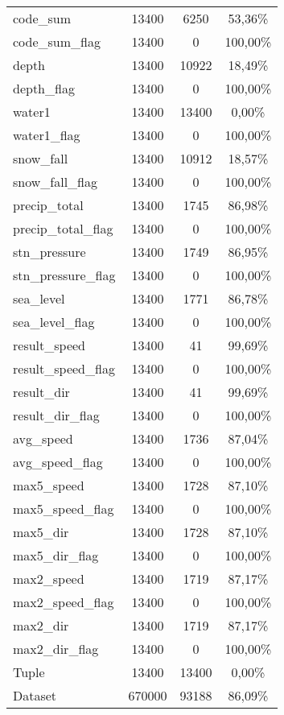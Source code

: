 \begin{longtable}{lccc}
		code\_sum			& 13400 & 6250	     & 53,36\%  	\\
		code\_sum\_flag		& 13400 & 0		     & 100,00\% 	\\	
		depth				& 13400 & 10922		 & 18,49\%  	\\
		depth\_flag			& 13400 & 0		   	 & 100,00\%		\\	
		water1				& 13400 & 13400		 & 0,00\%		\\
		water1\_flag		& 13400 & 0		   	 & 100,00\%		\\	
		snow\_fall			& 13400 & 10912		 & 18,57\%		\\	
		snow\_fall\_flag	& 13400 & 0		   	 & 100,00\%		\\		
		precip\_total		& 13400 & 1745		 & 86,98\%		\\	
		precip\_total\_flag	& 13400 & 0		   	 & 100,00\%		\\		
		stn\_pressure		& 13400 & 1749		 & 86,95\%		\\	
		stn\_pressure\_flag	& 13400 & 0		   	 & 100,00\%		\\		
		sea\_level			& 13400 & 1771		 & 86,78\%		\\	
		sea\_level\_flag	& 13400 & 0		   	 & 100,00\%		\\		
		result\_speed		& 13400 & 41		 & 99,69\%		\\	
		result\_speed\_flag	& 13400 & 0		   	 & 100,00\%		\\		
		result\_dir			& 13400 & 41		 & 99,69\%		\\			
		result\_dir\_flag	& 13400 & 0		   	 & 100,00\%		\\		
		avg\_speed			& 13400 & 1736		 & 87,04\%		\\	
		avg\_speed\_flag	& 13400 & 0		   	 & 100,00\%		\\		
		max5\_speed			& 13400 & 1728		 & 87,10\%		\\	
		max5\_speed\_flag	& 13400 & 0		   	 & 100,00\%		\\		
		max5\_dir			& 13400 & 1728		 & 87,10\%		\\
		max5\_dir\_flag		& 13400 & 0		   	 & 100,00\%		\\	
		max2\_speed			& 13400 & 1719		 & 87,17\%		\\	
		max2\_speed\_flag	& 13400 & 0		   	 & 100,00\%		\\		
		max2\_dir			& 13400 & 1719		 & 87,17\%		\\
		max2\_dir\_flag		& 13400 & 0		   	 & 100,00\%		\\	
		\midrule
		Tuple 			& 13400  &	13400	 & 0,00\%		\\
		Dataset  		& 670000 &	93188 	 & 86,09\%		\\
		\bottomrule
		
	\end{longtable}
	\label{tab:completezza weather}


